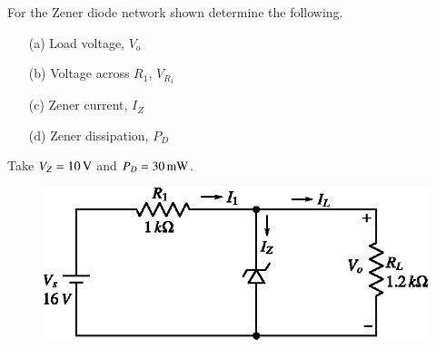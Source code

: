 \begin{example}\label{exam2.32}
For the Zener diode network shown determine the following.
\begin{itemize}
\item[(a)] Load voltage, $V_{o}$

\item[(b)] Voltage across $R_{1}$, $V_{R_{1}}$

\item[(c)] Zener current, $I_{Z}$

\item[(d)] Zener dissipation, $P_{D}$
\end{itemize}

Take $V_{Z}=10\text{\,V}$ and $P_{D}=30\text{\,mW}$.
\begin{figure}[H]
\centering
\includegraphics{chap2/exp2.30.eps}
\end{figure}
\end{example}

